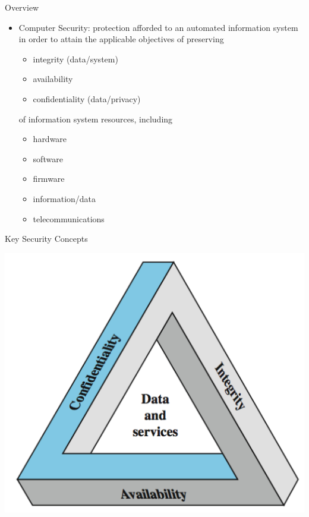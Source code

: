 \documentclass{beamer}
\begin{document}
\begin{frame}{Overview}
  \begin{itemize}
  \item \alert{Computer Security}: protection afforded to an 
    automated information system in order to attain 
    the applicable objectives of preserving
    
    \begin{itemize}
    \item integrity (data/system)
    \item availability
    \item confidentiality (data/privacy)
    \end{itemize}
of  information system resources, including
 
\begin{itemize}
  \item hardware
  \item software
  \item firmware
  \item information/data
  \item telecommunications
\end{itemize}
  \end{itemize}
\end{frame}


\begin{frame}{Key Security Concepts}
  \begin{center}
    \includegraphics[width=0.7\linewidth]{concepts}
  \end{center}
\end{frame}
\end{document}
